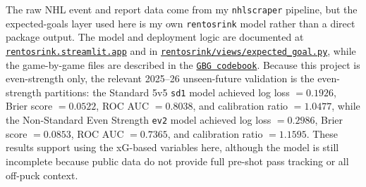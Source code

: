\documentclass[
  10pt,
]{extarticle}
\begin{document}
The raw NHL event and report data come from my \texttt{nhlscraper} pipeline, but the expected-goals layer used here is my own \texttt{rentosrink} model rather than a direct package output. The model and deployment logic are documented at \href{https://rentosrink.streamlit.app/expected_goal}{\texttt{rentosrink.streamlit.app}} and in \href{https://github.com/RentoSaijo/rentosrink/blob/main/views/expected_goal.py}{\texttt{rentosrink/views/expected\_goal.py}}, while the game-by-game files are described in the \href{https://github.com/RentoSaijo/rentosrink/blob/main/scripts/gbgs/codebook.md}{\texttt{GBG codebook}}. Because this project is even-strength only, the relevant 2025--26 unseen-future validation is the even-strength partitions: the Standard 5v5 \texttt{sd1} model achieved log loss \(= 0.1926\), Brier score \(= 0.0522\), ROC AUC \(= 0.8038\), and calibration ratio \(= 1.0477\), while the Non-Standard Even Strength \texttt{ev2} model achieved log loss \(= 0.2986\), Brier score \(= 0.0853\), ROC AUC \(= 0.7365\), and calibration ratio \(= 1.1595\). These results support using the xG-based variables here, although the model is still incomplete because public data do not provide full pre-shot pass tracking or all off-puck context.
\end{document}
